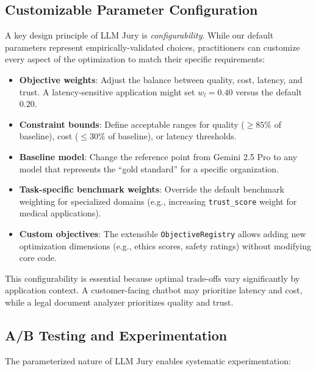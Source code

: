 \documentclass[11pt,a4paper]{article}
\begin{document}
\subsection{Customizable Parameter Configuration}

A key design principle of LLM Jury is \textit{configurability}. While our default parameters represent empirically-validated choices, practitioners can customize every aspect of the optimization to match their specific requirements:

\begin{itemize}
    \item \textbf{Objective weights}: Adjust the balance between quality, cost, latency, and trust. A latency-sensitive application might set $w_l = 0.40$ versus the default $0.20$.
    
    \item \textbf{Constraint bounds}: Define acceptable ranges for quality ($\geq 85\%$ of baseline), cost ($\leq 30\%$ of baseline), or latency thresholds.
    
    \item \textbf{Baseline model}: Change the reference point from Gemini 2.5 Pro to any model that represents the ``gold standard'' for a specific organization.
    
    \item \textbf{Task-specific benchmark weights}: Override the default benchmark weighting for specialized domains (e.g., increasing \texttt{trust\_score} weight for medical applications).
    
    \item \textbf{Custom objectives}: The extensible \texttt{ObjectiveRegistry} allows adding new optimization dimensions (e.g., ethics scores, safety ratings) without modifying core code.
\end{itemize}

This configurability is essential because optimal trade-offs vary significantly by application context. A customer-facing chatbot may prioritize latency and cost, while a legal document analyzer prioritizes quality and trust.

\subsection{A/B Testing and Experimentation}

The parameterized nature of LLM Jury enables systematic experimentation:
\end{document}

